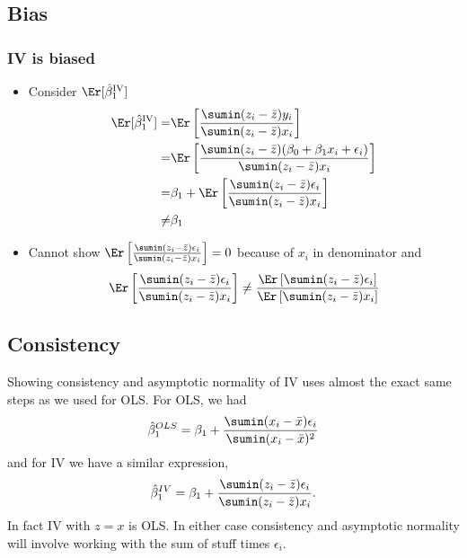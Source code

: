 \subsection{Bias}
\begin{frame}[allowframebreaks]\frametitle{IV is biased}
  \begin{itemize}
  \item Consider $\Er[\biv_1]$
    \begin{align*}
      \Er[\biv_1] = & \Er\left[ \frac{\sumin (z_i - \bar{z}) y_i}
        {\sumin (z_i - \bar{z})x_i } \right] \\
      = & \Er\left[ \frac{\sumin (z_i - \bar{z}) (\beta_0 + \beta_1
          x_i + \epsilon_i)}
        {\sumin (z_i - \bar{z})x_i }\right] \\ 
      = & \beta_1 + \Er\left[\frac{\sumin (z_i - \bar{z})\epsilon_i}
        {\sumin (z_i - \bar{z})x_i } \right] \\
      \neq & \beta_1
    \end{align*}
  \item Cannot show $\Er\left[\frac{\sumin (z_i - \bar{z})\epsilon_i} 
      {\sumin (z_i - \bar{z})x_i } \right] = 0$ because of $x_i$ in
    denominator and  
    \[ \Er\left[\frac{\sumin (z_i - \bar{z})\epsilon_i}
      {\sumin (z_i - \bar{z})x_i } \right]  \neq
    \frac{\Er\left[\sumin (z_i - \bar{z})\epsilon_i \right]}
    {\Er\left[ \sumin (z_i - \bar{z})x_i \right] } \]
  \end{itemize}
\end{frame}

\subsection{Consistency}

Showing consistency and asymptotic normality of IV uses almost the exact
same steps as we used for OLS. For OLS, we had
\[ \hat{\beta}_1^{OLS} = \beta_1 + \frac{\sumin (x_i -
    \bar{x})\epsilon_i}{\sumin (x_i - \bar{x})^2} \]
and for IV we have a similar expression,
\[ \hat{\beta}_1^{IV} = \beta_1 + \frac{\sumin (z_i -
    \bar{z})\epsilon_i}{\sumin (z_i - \bar{z})x_i}. \]
In fact IV with $z=x$ is OLS. In either case consistency and
asymptotic normality will involve working with the sum of stuff
times $\epsilon_i$.

